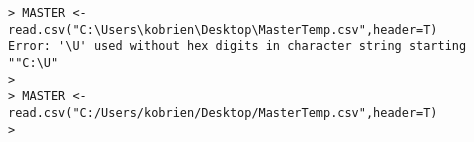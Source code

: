 
\begin{frame}[fragile]
\begin{verbatim}
> MASTER <- read.csv("C:\Users\kobrien\Desktop\MasterTemp.csv",header=T)
Error: '\U' used without hex digits in character string starting ""C:\U"
> 
> MASTER <- read.csv("C:/Users/kobrien/Desktop/MasterTemp.csv",header=T)
> 

\end{verbatim}
\end{frame}
